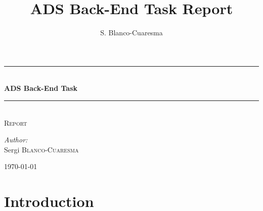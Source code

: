 \documentclass[a4paper,10pt,twoside]{article}
\title{ADS Back-End Task Report}
\author{S. Blanco-Cuaresma}
\begin{document}
\sffamily

\begin{titlepage}
    \thispagestyle{empty}
    \begin{center}
        \rule{\linewidth}{0.5mm}
        \\[0.4cm]
            {\huge \bfseries ADS Back-End Task}
        \\[0.4cm]
        \rule{\linewidth}{0.5mm}
        \\[1.5cm]
            \textsc{\Large Report}
        \\[1.5cm]

        \begin{minipage}{0.4\textwidth}
            \begin{flushleft} \large
                \emph{Author:}\\
                Sergi \textsc{Blanco-Cuaresma}
            \end{flushleft}
        \end{minipage}

        \vfill

        {\large \today}

    \end{center}
\end{titlepage}



\tableofcontents{}
\thispagestyle{empty}
\newpage

\section{Introduction}
\end{document}
